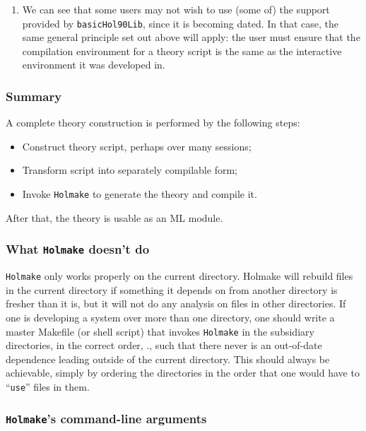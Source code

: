 \begin{enumerate}
\item We can see that some users may not wish to use (some of) the
  support provided by \verb+basicHol90Lib+, since it is becoming
  dated. In that case, the same general principle set out above will
  apply: the user must ensure that the compilation environment for a
  theory script is the same as the interactive environment it was
  developed in.

\end{enumerate}

\subsubsection{Summary}

A complete theory construction is performed by the following steps:
\begin{itemize}
\item Construct theory script, perhaps over many sessions;
\item Transform script into separately compilable form;
\item Invoke {\tt Holmake} to generate the theory and compile it.
\end{itemize}

After that, the theory is usable as an ML module.

\subsubsection{What {\tt Holmake} doesn't do}

{\tt Holmake} only works properly on the current directory.  Holmake
will rebuild files in the current directory if something it depends on
from another directory is fresher than it is, but it will not do any
analysis on files in other directories.  If one is developing a system
over more than one directory, one should write a master Makefile (or
shell script) that invokes {\tt Holmake} in the subsidiary
directories, in the correct order, \ie., such that there never is an
out-of-date dependence leading outside of the current directory. This
should always be achievable, simply by ordering the directories in the
order that one would have to ``\verb+use+'' files in them.

\subsubsection{{\tt Holmake}'s command-line arguments}

